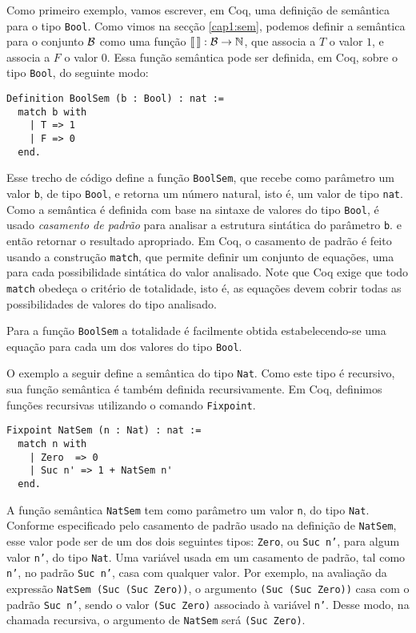 Como primeiro exemplo, vamos escrever, em Coq, uma definição de semântica para o tipo
\texttt{Bool}. Como vimos na sec\c{c}\~ao \ref{cap1:sem}, podemos definir a sem\^antica para o conjunto $\mathcal{B}$ como uma função $\llbracket\,\rrbracket : \mathcal{B} \rightarrow \mathbb{N}$, que associa a $T$ o valor $1$, e associa a $F$ o valor $0$.
Essa função semântica pode ser definida, em Coq, sobre o tipo \texttt{Bool}, do seguinte modo:
\begin{lstlisting}
Definition BoolSem (b : Bool) : nat :=
  match b with
    | T => 1
    | F => 0
  end.
\end{lstlisting}
Esse trecho de c\'odigo define a fun\c{c}\~ao \texttt{BoolSem}, que recebe
como par\^ametro um valor \texttt{b}, de tipo \texttt{Bool}, e
retorna um n\'umero natural, isto é, um valor de tipo \texttt{nat}. Como a
sem\^antica é definida com base na sintaxe de valores do tipo \texttt{Bool}, é usado \emph{casamento de padr\~ao\/} para analisar a estrutura sint\'atica do par\^ametro \texttt{b}.  e ent\~ao retornar o resultado apropriado. Em Coq, o casamento de padr\~ao \'e feito usando a constru\c{c}\~ao \texttt{match}, que permite definir um conjunto de equa\c{c}\~oes, uma para cada possibilidade sint\'atica do valor analisado. Note que Coq exige que todo \texttt{match} obede\c{c}a o crit\'erio de totalidade, isto é, as equa\c{c}\~oes devem cobrir todas as possibilidades de valores do tipo analisado.

Para a fun\c{c}\~ao \texttt{BoolSem} a totalidade \'e facilmente obtida estabelecendo-se uma equa\c{c}\~ao para cada um dos valores do tipo \texttt{Bool}.

O exemplo a seguir define a sem\^antica do tipo \texttt{Nat}. Como
este tipo \'e recursivo, sua fun\c{c}\~ao sem\^antica é tamb\'em definida recursivamente.
Em Coq, definimos fun\c{c}\~oes recursivas utilizando o comando \texttt{Fixpoint}.

\begin{lstlisting}
Fixpoint NatSem (n : Nat) : nat :=
  match n with
    | Zero  => 0
    | Suc n' => 1 + NatSem n'
  end.
\end{lstlisting}

A função semântica \texttt{NatSem} tem como parâmetro um valor \texttt{n}, do tipo \texttt{Nat}. Conforme especificado pelo casamento de padrão usado na definição de \texttt{NatSem}, esse valor pode ser de um dos dois seguintes tipos: \texttt{Zero}, ou \texttt{Suc n'}, para algum valor \texttt{n'}, do tipo \texttt{Nat}. Uma variável usada em um casamento de padrão, tal como \texttt{n'}, no padrão \texttt{Suc n'}, casa com qualquer valor. Por exemplo, na avaliação da expressão \texttt{NatSem (Suc (Suc Zero))}, o argumento \texttt{(Suc (Suc Zero))} casa com o padrão \texttt{Suc n'}, sendo o valor \texttt{(Suc Zero)} associado à variável \texttt{n'}. Desse modo, na chamada recursiva, o argumento de \texttt{NatSem} será \texttt{(Suc Zero)}.

